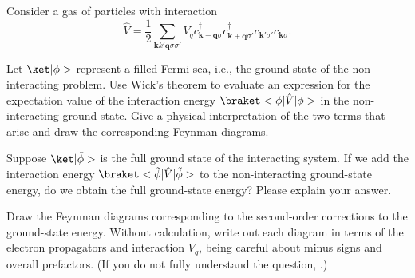 \begin{problem}
  Consider a gas of particles with interaction
  \[
    \hat V = \frac12 \sum_{\bm k k' \bm q \sigma \sigma'} V_q
      c_{\bm k - \bm q\sigma}^\dagger
      c_{\bm k + \bm q\sigma'}^\dagger
      c_{\bm k' \sigma'} c_{\bm k\sigma}.
  \]
  \begin{enumext}
      \item Let $\ket|\phi>$ represent a filled Fermi sea, i.e., the ground
      state of the non-interacting problem. Use Wick's theorem to evaluate an
      expression for the expectation value of the interaction
      energy $\braket<\phi|\hat V|\phi>$ in the non-interacting ground state.
      Give a physical interpretation of the two terms that arise and draw the
      corresponding Feynman diagrams.
      \item Suppose $\ket|\tilde\phi>$ is the full ground state of the
      interacting
      system. If we add the interaction
      energy $\braket<\tilde\phi|\hat V|\tilde\phi>$ to the non-interacting
      ground-state energy, do we obtain the full ground-state energy? Please
      explain your answer.
      \item Draw the Feynman diagrams corresponding to the second-order
      corrections to the ground-state energy. Without calculation, write out each
      diagram in terms of the electron propagators and interaction $V_q$, being
      careful about minus signs and overall prefactors.
      (If you do not fully understand the question,
      \citep[see][\#7.4.1]{1_coleman2015introduction}.)
    \end{enumext}
  \end{problem}
